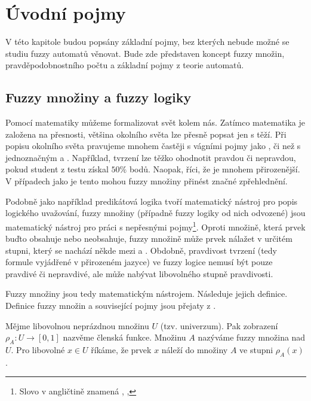 \documentclass[a4paper,10pt]{article}
\begin{document}
\section{Úvodní pojmy}
V této kapitole budou popsány základní pojmy, bez kterých nebude možné se studiu fuzzy automatů věnovat. Bude zde představen koncept fuzzy množin, pravděpodobnostního počtu a základní pojmy z teorie automatů.

\subsection{Fuzzy množiny a fuzzy logiky}
Pomocí matematiky můžeme formalizovat svět kolem nás. Zatímco matematika je založena na přesnosti, většina okolního světa lze přesně popsat jen s těží. Při popisu okolního světa pravujeme mnohem častěji s vágními pojmy jako ,  či  než s jednoznačným  a . Například, tvrzení  lze těžko ohodnotit pravdou či nepravdou, pokud student z testu získal $50\%$ bodů. Naopak, říci, že  je mnohem přirozenější. V případech jako je tento mohou fuzzy množiny přinést značné zpřehlednění.

Podobně jako například predikátová logika tvoří matematický nástroj pro popis logického uvažování, fuzzy množiny (případně fuzzy logiky od nich odvozené) jsou matematický nástroj pro práci s nepřesnými pojmy\footnote{Slovo  v angličtině znamená , , }. Oproti  množině, která prvek buďto obsahuje nebo neobsahuje, fuzzy množině může prvek nálažet v určitém stupni, který se nachází někde mezi  a . Obdobně, pravdivost tvrzení (tedy formule vyjádřené v přirozeném jazyce) ve fuzzy logice nemusí být pouze pravdivé či nepravdivé, ale může nabývat libovolného stupně pravdivosti.

Fuzzy množiny jsou tedy matematickým nástrojem. Následuje jejich definice. Definice fuzzy množin a související pojmy jsou přejaty z \cite{Bel-FuzRelSys}.

\begin{definition}
 Mějme libovolnou neprázdnou množinu $U$ (tzv. univerzum). Pak zobrazení $\rho_A: U \rightarrow [0, 1]$ nazvěme členská funkce. Množinu $A$ nazýváme fuzzy množina nad $U$. Pro libovolné $x \in U$ říkáme, že prvek $x$ náleží do množiny $A$ ve stupni $\rho_A(x)$.
\end{definition}
\end{document}
